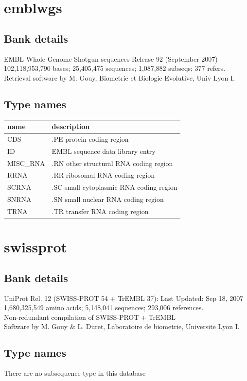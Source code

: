 \documentclass{article}
\begin{document}
\begin{Schunk}
\section{ emblwgs }
\subsection{Bank details}
EMBL Whole Genome Shotgun sequences Release 92  (September 2007)\\
102,118,953,790 bases; 25,405,475 sequences; 1,087,882 subseqs; 377 refers.\\
Retrieval software by M. Gouy, Biometrie et Biologie Evolutive, Univ Lyon I.

\subsection{Type names}
\noindent\begin{tabular}{ll}
\hline \hline
name & description\\
\hline
CDS & .PE protein coding region \\
ID & EMBL sequence data library entry \\
MISC\_RNA & .RN other structural RNA coding region \\
RRNA & .RR ribosomal RNA coding region \\
SCRNA & .SC small cytoplasmic RNA coding region \\
SNRNA & .SN small nuclear RNA coding region \\
TRNA & .TR transfer RNA coding region \\
\hline \hline
\end{tabular}

\section{ swissprot }
\subsection{Bank details}
UniProt Rel. 12 (SWISS-PROT 54 + TrEMBL 37): Last Updated: Sep 18, 2007\\
1,680,325,549 amino acids; 5,148,041 sequences; 293,006 references.\\
Non-redundant compilation of SWISS-PROT + TrEMBL\\
Software by M. Gouy \& L. Duret, Laboratoire de biometrie, Universite Lyon I.

\subsection{Type names}
There are no subsequence type in this database

\end{Schunk}
\end{document}
